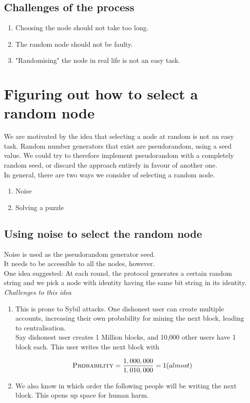 \documentclass[10pt,a4paper]{article}
\begin{document}
\subsection{Challenges of the process}
\begin{enumerate}
\item Choosing the node should not take too long.

\item The random node should not be faulty.

\item "Randomising" the node in real life is not an easy task.
\end{enumerate}


\section{Figuring out how to select a random node}
We are motivated by the idea that selecting a node at random is not an easy task. Random number generators that exist are pseudorandom, using a seed value. We could try to therefore implement pseudorandom with a completely random seed, or discard the approach entirely in favour of another one.\\
In general, there are two ways we consider of selecting a random node. 
\begin{enumerate}
\item Noise

\item Solving a puzzle
\end{enumerate}

\subsection{Using noise to select the random node}
Noise is used as the pseudorandom generator seed.\\
It needs to be accessible to all the nodes, however. \\
One idea suggested: At each round, the protocol generates a certain random string and we pick a node with identity having the same bit string in its identity.\\
\emph{Challenges to this idea}
\begin{enumerate}
\item This is prone to Sybil attacks. One dishonest user can create multiple accounts, increasing their own probability for mining the next block, leading to centralisation.\\

Say dishonest user creates 1 Million blocks, and 10,000 other users have 1 block each. This user writes the next block with
\begin{center}
$$ \textsc{Probability} = \frac{1,000,000}{1,010,000}
 = 1 (almost) $$
\end{center}

\item We also know in which order the following people will be writing the next block. This opens up space for human harm.

\end{enumerate}
\end{document}
